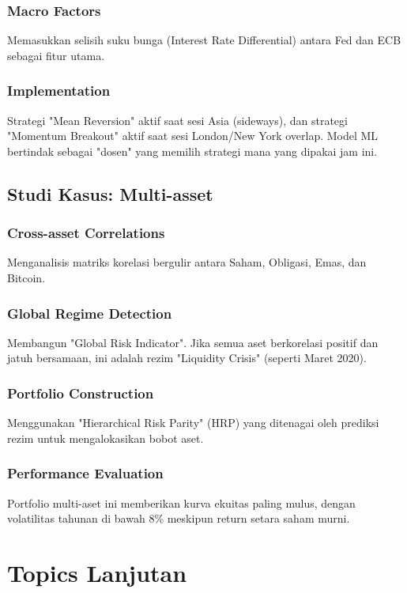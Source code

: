 \documentclass[12pt,a4paper]{book}
\begin{document}
\section{Macro Factors}
Memasukkan selisih suku bunga (Interest Rate Differential) antara Fed dan ECB sebagai fitur utama. 

\section{Implementation}
Strategi "Mean Reversion" aktif saat sesi Asia (sideways), dan strategi "Momentum Breakout" aktif saat sesi London/New York overlap. Model ML bertindak sebagai "dosen" yang memilih strategi mana yang dipakai jam ini.

\chapter{Studi Kasus: Multi-asset}
\section{Cross-asset Correlations}
Menganalisis matriks korelasi bergulir antara Saham, Obligasi, Emas, dan Bitcoin.

\section{Global Regime Detection}
Membangun "Global Risk Indicator". Jika semua aset berkorelasi positif dan jatuh bersamaan, ini adalah rezim "Liquidity Crisis" (seperti Maret 2020).

\section{Portfolio Construction}
Menggunakan "Hierarchical Risk Parity" (HRP) yang ditenagai oleh prediksi rezim untuk mengalokasikan bobot aset.

\section{Performance Evaluation}
Portfolio multi-aset ini memberikan kurva ekuitas paling mulus, dengan volatilitas tahunan di bawah 8\% meskipun return setara saham murni.

\part{Topics Lanjutan}
\end{document}

